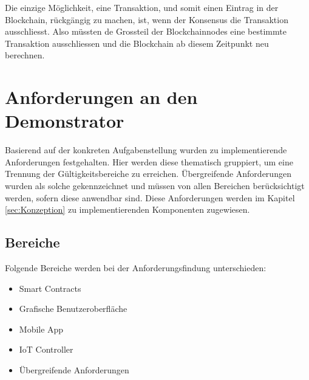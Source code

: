 Die einzige Möglichkeit, eine Transaktion, und somit einen Eintrag in der Blockchain, rückgängig zu machen, ist, wenn der Konsensus die Transaktion ausschliesst. Also müssten de Grossteil der Blockchainnodes eine bestimmte Transaktion ausschliessen und die Blockchain ab diesem Zeitpunkt neu berechnen. \cite{BlockchainRevolution}


\section{Anforderungen an den Demonstrator}
\label{sec:Anforderungen_Demonstrator}
Basierend auf der konkreten Aufgabenstellung wurden zu implementierende Anforderungen festgehalten. Hier werden diese thematisch gruppiert, um eine Trennung der Gültigkeitsbereiche zu erreichen. Übergreifende Anforderungen wurden als solche gekennzeichnet und müssen von allen Bereichen berücksichtigt werden, sofern diese anwendbar sind. Diese Anforderungen werden im Kapitel \ref{sec:Konzeption}  zu implementierenden Komponenten zugewiesen.

\subsection{Bereiche}
Folgende Bereiche werden bei der Anforderungsfindung unterschieden:
\begin{itemize}
    \item Smart Contracts
    \item Grafische Benutzeroberfläche
    \item Mobile App
    \item IoT Controller
    \item Übergreifende Anforderungen
\end{itemize}

